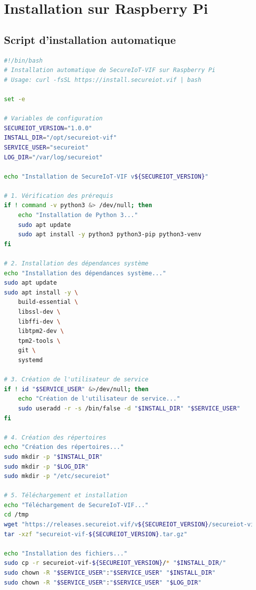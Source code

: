 \section{Installation sur Raspberry Pi}

\subsection{Script d'installation automatique}

\begin{lstlisting}[language=bash, caption={Script d'installation Raspberry Pi}]
#!/bin/bash
# Installation automatique de SecureIoT-VIF sur Raspberry Pi
# Usage: curl -fsSL https://install.secureiot.vif | bash

set -e

# Variables de configuration
SECUREIOT_VERSION="1.0.0"
INSTALL_DIR="/opt/secureiot-vif"
SERVICE_USER="secureiot"
LOG_DIR="/var/log/secureiot"

echo "Installation de SecureIoT-VIF v${SECUREIOT_VERSION}"

# 1. Vérification des prérequis
if ! command -v python3 &> /dev/null; then
    echo "Installation de Python 3..."
    sudo apt update
    sudo apt install -y python3 python3-pip python3-venv
fi

# 2. Installation des dépendances système
echo "Installation des dépendances système..."
sudo apt update
sudo apt install -y \
    build-essential \
    libssl-dev \
    libffi-dev \
    libtpm2-dev \
    tpm2-tools \
    git \
    systemd

# 3. Création de l'utilisateur de service
if ! id "$SERVICE_USER" &>/dev/null; then
    echo "Création de l'utilisateur de service..."
    sudo useradd -r -s /bin/false -d "$INSTALL_DIR" "$SERVICE_USER"
fi

# 4. Création des répertoires
echo "Création des répertoires..."
sudo mkdir -p "$INSTALL_DIR"
sudo mkdir -p "$LOG_DIR"
sudo mkdir -p "/etc/secureiot"

# 5. Téléchargement et installation
echo "Téléchargement de SecureIoT-VIF..."
cd /tmp
wget "https://releases.secureiot.vif/v${SECUREIOT_VERSION}/secureiot-vif-${SECUREIOT_VERSION}.tar.gz"
tar -xzf "secureiot-vif-${SECUREIOT_VERSION}.tar.gz"

echo "Installation des fichiers..."
sudo cp -r secureiot-vif-${SECUREIOT_VERSION}/* "$INSTALL_DIR/"
sudo chown -R "$SERVICE_USER":"$SERVICE_USER" "$INSTALL_DIR"
sudo chown -R "$SERVICE_USER":"$SERVICE_USER" "$LOG_DIR"


\end{lstlisting}
